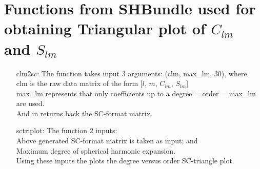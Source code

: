 \documentclass[a4paper,12pt]{report}
\begin{document}
\section{Functions from SHBundle used for obtaining Triangular plot of $C_{lm}$ and $S_{lm}$}
\begin{itemize}
	\item[clm2sc: ] The function takes input 3 arguments: (clm, max\_{lm}, 30), where\\clm is the raw data matrix of the form [$l$, $m$, $C_{lm}$, $S_{lm}$]\\max\_{lm} represents that only coefficients up to a degree = order = max\_lm are used. \\And in returns back the SC-format matrix.
	\item[sctriplot: ] The function 2 inputs:\\Above generated SC-format matrix is taken as input; and\\Maximum degree of spherical harmonic expansion.\\Using these inputs the plots the degree versus order SC-triangle plot.
\end{itemize}
\end{document}
